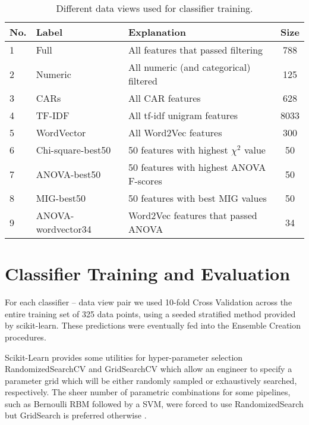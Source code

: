 \begin{table}[]
    \centering
    \begin{tabular}{|l|l|l|c|}
    \hline
    \textsf{No.} & \textsf{Label} & \textsf{Explanation} & \textsf{Size}\\
    \hline
        1 & \textsf{Full} & All features that passed filtering & 788 \\ 
        2 & \textsf{Numeric} & All numeric (and categorical) filtered & 125\\ 
        3 & \textsf{CARs} & All CAR features & 628 \\
        4 & \textsf{TF-IDF} & All tf-idf unigram features & 8033\\
        5 & \textsf{WordVector}& All \textsf{Word2Vec} features & 300\\
        6 & \textsf{Chi-square-best50}& 50 features with highest $\chi^2$ value & 50\\
        7 & \textsf{ANOVA-best50} & 50 features with highest ANOVA F-scores & 50 \\
        8 & \textsf{MIG-best50} & 50 features with best MIG values & 50 \\
        9 & \textsf{ANOVA-wordvector34}& \textsf{Word2Vec} features that passed ANOVA& 34\\
    \hline
    \end{tabular}
    \caption{Different data views used for classifier training.}
    \label{tab:dataviews}
\end{table}

\section{Classifier Training and Evaluation}

For each classifier -- data view pair
we used 10-fold Cross Validation across the entire training set of 325 data points, using a seeded stratified method provided by \textsf{scikit-learn}. These predictions were eventually fed into the Ensemble Creation procedures. 

Scikit-Learn provides some utilities for hyper-parameter selection \textsf{RandomizedSearchCV} and \textsf{GridSearchCV} which allow an engineer to specify a parameter grid which will be either randomly sampled or exhaustively searched, respectively. The sheer number of parametric combinations for some pipelines, such as Bernoulli RBM followed by a SVM, were forced to use RandomizedSearch but GridSearch is preferred otherwise \cite{scikit-learn}.

